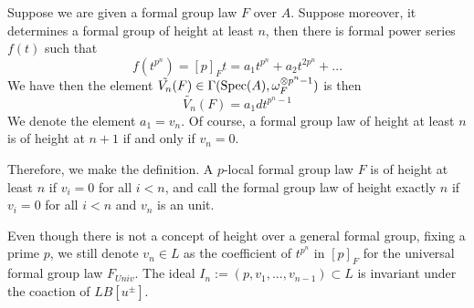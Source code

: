 \begin{remark}
    Suppose we are given a formal group law $F$ over $A$. Suppose moreover, it determines a formal group of height at least $n$, then there is formal power series $f(t)$ such that
    \[
    f(t^{p^n})=[p]_Ft=a_1t^{p^n}+a_{2}t^{2p^n}+...
    \]
    We have then the element $\tilde{V_n}(F) \in \Gamma(\operatorname{\mathrm{Spec}}(A), \omega_F^{\otimes p^n-1})$ is then 
    \[
        \tilde{V_n}(F)=a_1dt^{p^n-1}
    \]
    We denote the element $a_1=v_n$. Of course, a formal group law of height at least $n$ is of height at $n+1$ if and only if $v_n=0$.

    Therefore, we make the definition. A $p$-local formal group law $F$ is of height at least $n$ if $v_i=0$ for all $i<n$, and call the formal group law of height exactly $n$ if $v_i=0$ for all $i<n$ and $v_n$ is an unit.
\end{remark}

\begin{remark}
Even though there is not a concept of height over a general formal group, fixing a prime $p$, we still denote $v_n\in L$ as the coefficient of $t^{p^n}$ in $[p]_F$ for the universal formal group law $F_{Univ}$. The ideal $I_n:=(p,v_1,...,v_{n-1})\subset L$ is invariant under the coaction of $LB[u^{\pm}]$.
\end{remark}

